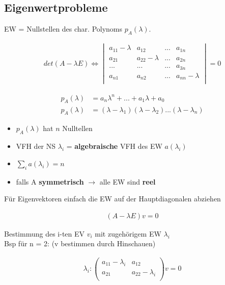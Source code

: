 \documentclass[10pt,a4paper]{article}
\begin{document}
\subsection{Eigenwertprobleme}
EW = Nullstellen des char. Polynoms $p_A(\lambda)$.\\
  \begin{mdframed}[style=exercise]
    \begin{align}
        det(A-\lambda E) \Longleftrightarrow 
        \begin{vmatrix}
             a_{11}-\lambda & a_{12} & ...  & a_{1n} \\
             a_{21}& a_{22}-\lambda & ... & a_{2n} \\
              ... & ...  & ...  & a_{3n} \\
             a_{n1} & a_{n2} & ... &  a_{nn}-\lambda\\
        \end{vmatrix} = 0
    \end{align}
  \end{mdframed}
  \begin{mdframed}[style=exercise]
    \begin{align}
        p_A(\lambda) &= a_n \lambda^n +...+ a_1 \lambda + a_0\\
        p_A(\lambda) &= (\lambda - \lambda_1)(\lambda - \lambda_2)...(\lambda - \lambda_n)
    \end{align}
  \end{mdframed}

  \begin{itemize}
    \item $p_A(\lambda)$ hat $n$ Nulltellen
    \item VFH der NS $\lambda_i$ = \textbf{algebraische} VFH des EW $a(\lambda_i)$ 
    \item $\sum_i a(\lambda_i) = n$ 
    \item falls A \textbf{symmetrisch} $\rightarrow$ alle EW sind \textbf{reel}
  \end{itemize}
Für Eigenvektoren einfach die EW auf der Hauptdiagonalen abziehen
  \begin{mdframed}[style=exercise]
    \begin{align}
        (A-\lambda E)v = 0
    \end{align}
  \end{mdframed}
Bestimmung des i-ten EV $v_i$ mit zugehörigem EW $\lambda_i$ \\
Bsp für n = 2: (v bestimmen durch Hinschauen)
  \begin{mdframed}[style=exercise]
    \begin{align}
        \lambda_i : 
        \begin{pmatrix}
            a_{11}-\lambda_i & a_{12} \\
            a_{21} & a_{22}-\lambda_i \\
        \end{pmatrix} v = 0
    \end{align}
  \end{mdframed}
\end{document}
